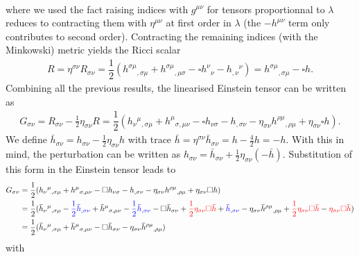 \documentclass[10pt, a4paper]{article}
\begin{document}
{\begin{align*}
\end{align*}
where we used the fact raising indices with $g^{\mu\nu}$ for tensors proportionnal to $\lambda$ reduces to contracting them with $\eta^{\mu\nu}$ at first order in $\lambda$ (the $-h^{\mu \nu}$ term only contributes to second order). Contracting the remaining indices (with the Minkowski) metric yields the Ricci scalar 
\begin{align*}
  R = \eta^{\sigma \nu} R_{\sigma \nu} = \dfrac{1}{2}(h^{\sigma\mu}{}_{, \sigma \mu} + h^{\sigma \mu}{}_{, \mu \sigma}-\square h^{\nu}{}_{\nu} - h_{, \nu}{}^{\nu} ) = h^{\sigma\mu}{}_{, \sigma \mu} -\square h.
\end{align*}
Combining all the previous results, the linearised Einstein tensor can be written as 
\begin{align*}
  G_{\sigma \nu} = R_{\sigma \nu} - \frac{1}{2} \eta_{\sigma\nu} R = \dfrac{1}{2}(h_{\nu}{}^{\mu}{}_{, \sigma \mu} + h^\mu{}_{\sigma, \mu \nu}-\square h_{\nu \sigma} - h_{, \sigma \nu} - \eta_{\sigma\nu} h^{\rho\mu}{}_{, \rho \mu} + \eta_{\sigma\nu} \square h).
\end{align*}
We define $\bar{h}_{\sigma \nu} = h_{\sigma \nu} - \frac{1}{2}\eta_{\sigma \nu} h$ with trace  $\bar{h} = \eta^{\sigma \nu}\bar{h}_{\sigma \nu} = h - \frac{4}{2} h = -h$. With this in mind, the perturbation can be written as $h_{\sigma \nu} =  \bar{h}_{\sigma \nu} + \frac{1}{2}\eta_{\sigma \nu} (-\bar{h})$. Substitution of this form in the Einstein tensor leads to 
\begin{align*}
  G_{\sigma \nu} &= \dfrac{1}{2}(h_{\nu}{}^{\mu}{}_{, \sigma \mu} + h^\mu{}_{\sigma, \mu \nu}-\square h_{\nu \sigma} - h_{, \sigma \nu} - \eta_{\sigma\nu} h^{\rho\mu}{}_{, \rho \mu} + \eta_{\sigma\nu} \square h)\\
  &= \dfrac{1}{2}(\bar{h}_{\nu}{}^{\mu}{}_{, \sigma \mu}- \textcolor{blue}{\frac{1}{2} \bar{h}_{, \sigma \nu}} + \bar{h}^\mu{}_{\sigma, \mu \nu} - \textcolor{blue}{\frac{1}{2}\bar{h}_{, \sigma \nu}}-\square\bar{h}_{\sigma\nu} + \textcolor{red}{\frac{1}{2}\eta_{\sigma\nu} \square \bar{h}} + \textcolor{blue}{\bar{h}_{, \sigma \nu}}-\eta_{\sigma\nu}\bar{h}^{\rho\mu}{}_{, \rho \mu} + \textcolor{red}{\frac{1}{2}\eta_{\sigma\nu} \square\bar{h}} - \textcolor{red}{\eta_{\sigma\nu} \square \bar{h}})\\
  &= \dfrac{1}{2}(\bar{h}_{\nu}{}^{\mu}{}_{, \sigma \mu}+ \bar{h}^\mu{}_{\sigma, \mu \nu} -\square\bar{h}_{\sigma\nu} -\eta_{\sigma\nu}\bar{h}^{\rho\mu}{}_{, \rho \mu})
\end{align*}
with
\begin{align*}

\end{align*}}
\end{document}

